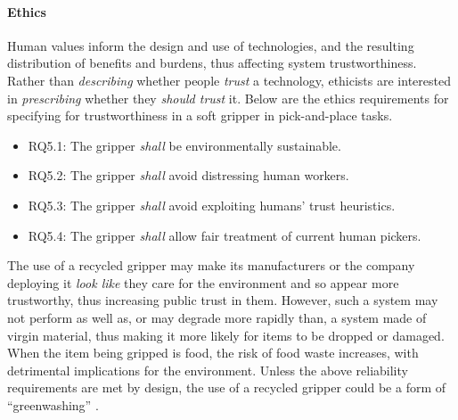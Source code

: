 \documentclass[lettersize,journal]{IEEEtran}
\begin{document}

\paragraph{Ethics}\label{ethics}
Human values inform the design and use of technologies, and the resulting distribution of benefits and burdens, thus affecting system trustworthiness. Rather than \emph{describing} whether people \emph{trust} a technology, ethicists are interested in \emph{prescribing} whether they \emph{should trust} it. Below are the ethics requirements for specifying for trustworthiness in a soft gripper in pick-and-place tasks.
\begin{itemize}
	\item RQ5.1: The gripper \emph{shall} 
        be environmentally sustainable. 
        \item RQ5.2: The gripper \emph{shall} avoid distressing human workers.
        \item RQ5.3: The gripper \emph{shall} avoid exploiting humans’ trust heuristics.
        \item RQ5.4: The gripper \emph{shall} allow fair treatment of current human pickers.
\end{itemize}

The use of a recycled gripper may make its manufacturers or the company deploying it \emph{look like} they care for the environment and so appear more trustworthy, thus increasing public trust in them. However, such a system may not perform as well as, or may degrade more rapidly than, a system made of virgin material, thus making it more likely for items to be dropped or damaged. When the item being gripped is food, the risk of food waste increases, with detrimental implications for the environment. Unless the above reliability requirements  are met by design, the use of a recycled gripper could be a form of “greenwashing” \cite{delmas2011drivers}.    
\end{document}
